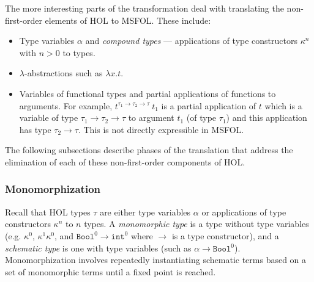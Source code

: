 \documentclass[11pt]{article}
\begin{document}
	The more interesting parts of the 
	transformation deal with 
	translating the non-first-order
	elements of HOL to MSFOL. These 
	include:
	\begin{itemize}
		\item Type variables $\alpha$
		and \textit{compound types} ---
		applications of type constructors
		$\kappa^n$ with $n > 0$ to 
		types.
		\item $\lambda$-abstractions 
		such as $\lambda x. t$.
		\item Variables of functional 
		types and partial applications 
		of functions to arguments. 
		For example, 
		$t^{\tau_1 \to \tau_2 \to 
			\tau}\ t_1$ is a 
		partial application of $t$ 
		which is a variable of type 
		$\tau_1 \to \tau_2 \to \tau$
		to argument $t_1$ (of type 
		$\tau_1$) and this 
		application has type 
		$\tau_2 \to \tau$.
		This is not directly 
		expressible in MSFOL.
	\end{itemize}
	The following subsections describe
	phases of the translation that 
	address the elimination of each of 
	these non-first-order components of 
	HOL.
	
	\subsubsection{Monomorphization}
	Recall that HOL types $\tau$ are 
	either type	variables $\alpha$ or 
	applications of type constructors 
	$\kappa^n$ to $n$ types.
	A \textit{monomorphic type} is a
	type without type variables 
	(e.g. $\kappa^0$, $\kappa^1 
	\kappa^0$, and $\texttt{Bool}^0 
	\to \texttt{int}^0$ 
	where $\to$ is 
	a type constructor), and 
	a \textit{schematic type} is one 
	with type variables (such as 
	$\alpha \to \texttt{Bool}^0$). 
	Monomorphization involves 
	repeatedly instantiating schematic
	terms based on a set of 
	monomorphic terms until a fixed 
	point is reached.
	
\end{document}
